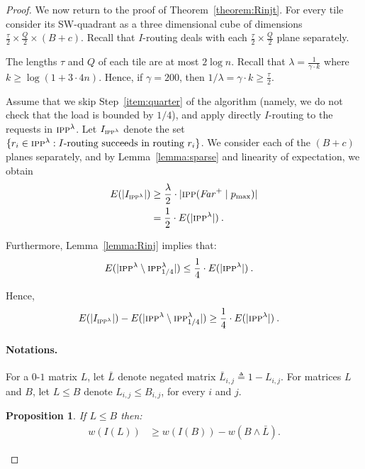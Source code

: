\documentclass[11pt]{article}
\newtheorem{proposition}[theorem]{Proposition}
\newcommand{\route}{\text{\sc{ipp}}}
\newcommand{\IPP}{\route}
\newcommand{\pmax}{p_{\max}}
\newcommand{\eqdf}{\triangleq}
\newenvironment{proof sketch}[1]{\noindent {\emph{Proof sketch of #1:}}}{\hfill \qed}
\newcommand{\far}{\text{\emph{Far}}}
\newcommand{\RIPP}{\IPP(\far^+ \mid \pmax)}\newcommand{\RIPPt}{\IPP^{\lambda}}
\newcommand{\Rinj}{\RIPPt_{1/4}}
\newcommand{\hl}{\tau}
\newcommand{\vl}{Q}
\begin{document}
\begin{proof}
We now return to the proof of Theorem~\ref{theorem:Rinjt}.  For every tile
consider its SW-quadrant as a three dimensional cube of dimensions
$\frac {\hl}{2} \times \frac {\vl}{2} \times (B+c)$. Recall that $I$-routing deals with
each $\frac {\hl}{2} \times \frac {\vl}{2}$ plane separately.

The lengths $\hl$ and $\vl$ of each tile are at most $2\log n$.  Recall that
$\lambda=\frac {1}{\gamma \cdot k}$ where $k\geq \log (1+3\cdot 4n)$. Hence,
if $\gamma=200$, then $1/\lambda = \gamma \cdot k \geq \frac{\tau}{2}$.

Assume that we skip Step~\ref{item:quarter} of the algorithm (namely, we do not check
that the load is bounded by $1/4$), and apply directly $I$-routing to the requests in
$\RIPPt$. Let $I_{\IPP^{\lambda}}$ denote the set $\{r_i\in \RIPPt : \text{$I$-routing
  succeeds in routing $r_i$}\}$.  We consider each of the $(B+c)$ planes separately, and by
Lemma~\ref{lemma:sparse} and linearity of expectation, we obtain
\begin{align}\label{eq:A}
    \nonumber
  E(|I_{\IPP^{\lambda}}|) &\geq \frac \lambda 2 \cdot |\RIPP|\\
&= \frac 12 \cdot E(|\RIPPt|)\:.
\end{align}

Furthermore, Lemma~\ref{lemma:Rinj} implies that:
\begin{align}\label{eq:B}
  E(|\RIPPt \setminus \Rinj|) &\leq \frac 14 \cdot E(|\RIPPt|)\:.
\end{align}

Hence,
\begin{align}\label{eq:almostqed}
  E(|I_{\IPP^{\lambda}}|)-E(|\RIPPt \setminus \Rinj|) &\geq \frac 14 \cdot E(|\RIPPt|)\:.
\end{align}

\paragraph{Notations.}
For a $0$-$1$ matrix $L$, let $\bar{L}$ denote negated matrix
$\bar{L}_{i,j}\eqdf1-L_{i,j}$.  For matrices $L$ and $B$, let $L\leq B$
denote $L_{i,j}\leq B_{i,j}$, for every $i$ and $j$.

\begin{proposition}\label{proposition:dom}
If $L\leq B$  then:
  \begin{eqnarray*}
  w(I(L))&\geq w(I(B))-w(B \wedge \bar{L}).
  \end{eqnarray*}
\end{proposition}


\end{proof}
\end{document}
